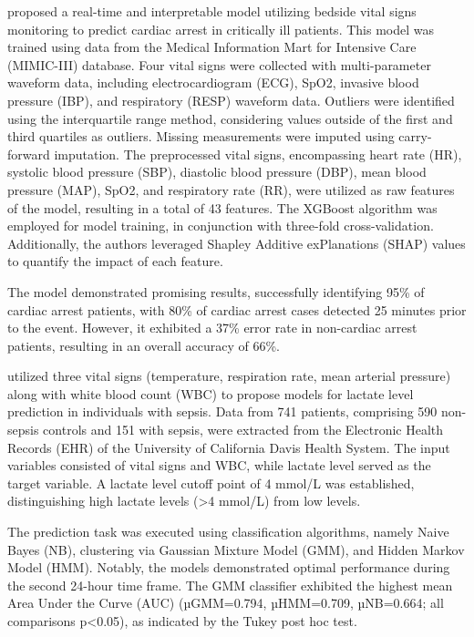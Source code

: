 \documentclass[12pt,a4paper,english
]{tunithesis}
\begin{document}
\textcite{yijing2022} proposed a real-time and interpretable model utilizing bedside vital signs monitoring to predict cardiac arrest in critically ill patients. This model was trained using data from the Medical Information Mart for Intensive Care (MIMIC-III) database. Four vital signs were collected with multi-parameter waveform data, including electrocardiogram (ECG), SpO2, invasive blood pressure (IBP), and respiratory (RESP) waveform data. Outliers were identified using the interquartile range method, considering values outside of the first and third quartiles as outliers. Missing measurements were imputed using carry-forward imputation. The preprocessed vital signs, encompassing heart rate (HR), systolic blood pressure (SBP), diastolic blood pressure (DBP), mean blood pressure (MAP), SpO2, and respiratory rate (RR), were utilized as raw features of the model, resulting in a total of 43 features. The XGBoost algorithm was employed for model training, in conjunction with three-fold cross-validation. Additionally, the authors leveraged Shapley Additive exPlanations (SHAP) values to quantify the impact of each feature. 

The model demonstrated promising results, successfully identifying 95\% of cardiac arrest patients, with 80\% of cardiac arrest cases detected 25 minutes prior to the event. However, it exhibited a 37\% error rate in non-cardiac arrest patients, resulting in an overall accuracy of 66\%. 

\textcite{gultepe2013} utilized three vital signs (temperature, respiration rate, mean arterial pressure) along with white blood count (WBC) to propose models for lactate level prediction in individuals with sepsis. Data from 741 patients, comprising 590 non-sepsis controls and 151 with sepsis, were extracted from the Electronic Health Records (EHR) of the University of California Davis Health System. The input variables consisted of vital signs and WBC, while lactate level served as the target variable. A lactate level cutoff point of 4 mmol/L was established, distinguishing high lactate levels (>4 mmol/L) from low levels.

The prediction task was executed using classification algorithms, namely Naive Bayes (NB), clustering via Gaussian Mixture Model (GMM), and Hidden Markov Model (HMM). Notably, the models demonstrated optimal performance during the second 24-hour time frame. The GMM classifier exhibited the highest mean Area Under the Curve (AUC) (µGMM=0.794, µHMM=0.709, µNB=0.664; all comparisons p<0.05), as indicated by the Tukey post hoc test.
\end{document}
